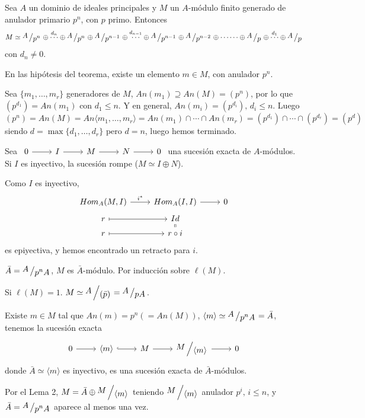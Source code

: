 \begin{teo}
    Sea $A$ un dominio de ideales principales y $M$ un $A$-m\'odulo finito generado de anulador primario $p^n$, con $p$ primo. Entonces 
    $$M \simeq \modulo{A}{p^n} \oplus \overset{d_n}{\cdots} \oplus \modulo{A}{p^n} \oplus \modulo{A}{p^{n-1}} \oplus \overset{d_{n-1}}{\cdots} \oplus \modulo{A}{p^{n-1}} \oplus \modulo{A}{p^{n-2}}\oplus \cdots \cdots  \oplus \modulo{A}{p}\oplus  \overset{d_1}{\cdots} \oplus \modulo{A}{p}$$
    con $d_n \neq 0$. 
\end{teo}
\begin{lem}
    En las hip\'otesis del teorema, existe un elemento $m \in M$, con anulador $p^n$.
\end{lem}
\begin{dem}
    Sea $\{m_1 , \ldots, m_r\}$ generadores de $M$, $An(m_1) \supseteq An(M) = (p^n)$, por lo que $(p^{d_1}) = An(m_1)$ con $d_1 \leq n$. Y en general, $An(m_i) = (p^{d_i}), \, d_i \leq n$. Luego $$(p^n) = An(M) = An\langle m_1, \ldots, m_r\rangle = An(m_1) \cap \cdots \cap An(m_r) = (p^{d_1}) \cap \cdots \cap (p^{d_r}) = (p^d)$$ siendo $d=\max\{d_1, \ldots, d_r\}$ pero $d=n$, luego hemos terminado.
\end{dem}
\begin{lem}
    Sea $\bt 0 \rar & I \rar & M \rar & N \rar & 0\et$ una sucesi\'on exacta de $A$-m\'odulos. Si $I$ es inyectivo, la sucesi\'on rompe ($M \simeq I \oplus N$). 
\end{lem}
\begin{dem}
    Como $I$ es inyectivo, $$\bt Hom_A(M, I)\rar{i^*} & Hom_A(I,I) \rar & 0 \\[-5mm] r\rarmaps & Id \\[-5mm] r \rarmaps & r\circ i \arrow[equal]{u} \et$$ es epiyectiva, y hemos encontrado un retracto para $i$.  
\end{dem}
\begin{dem}
     $\bar A = \modulo{A}{p^n A}$, $M$ es $\bar A$-m\'odulo. Por inducci\'on sobre $\ell(M)$. 

    Si $\ell(M)=1$. $M \simeq \modulo{A}{(\bar p)} = \modulo{A}{p A}$. 

    Existe $m \in M$ tal que $An(m) = p^n (=An(M))$, $\langle m \rangle \simeq \modulo{A}{p^n A} = \bar A$, tenemos la sucesi\'on exacta
    $$\bt 0 \rar & \langle m \rangle \rar[hook]  & M \rar & \modulo{M}{\langle m \rangle} \rar & 0   \et$$ donde $\bar A \simeq \langle m \rangle$ es inyectivo, es una sucesi\'on exacta de $\bar A$-m\'odulos. 
    
    Por el Lema 2, $M =\bar A \oplus \modulo{M}{\langle m \rangle}$ teniendo $ \modulo{M}{\langle m \rangle}$ anulador $p^i, \, i \leq n$, y $\bar A = \modulo{A}{p^n A}$ aparece al menos una vez. 
\end{dem}
